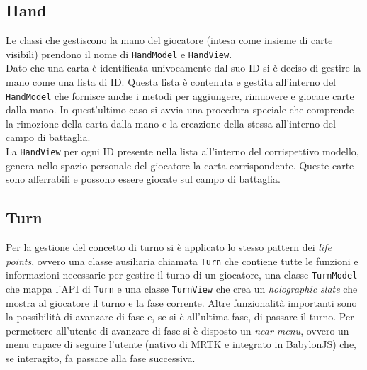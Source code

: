 \subsection{Hand}\label{subsec:hand}
Le classi che gestiscono la mano del giocatore (intesa come insieme di carte visibili) prendono il nome di \texttt{HandModel} e \texttt{HandView}.\\
Dato che una carta è identificata univocamente dal suo ID si è deciso di gestire la mano come una lista di ID. Questa lista è contenuta e gestita all'interno del 
\texttt{HandModel} che fornisce anche i metodi per aggiungere, rimuovere e giocare carte dalla mano. In quest'ultimo caso si avvia una procedura speciale che comprende la rimozione
della carta dalla mano e la creazione della stessa all'interno del campo di battaglia.\\
La \texttt{HandView} per ogni ID presente nella lista all'interno del corrispettivo modello, genera nello spazio personale del giocatore la carta corrispondente. Queste carte sono 
afferrabili e possono essere giocate sul campo di battaglia.\\

\subsection{Turn}\label{subsec:turn}
Per la gestione del concetto di turno si è applicato lo stesso pattern dei \textit{life points}, ovvero una classe ausiliaria chiamata \texttt{Turn} che contiene tutte le funzioni e
informazioni necessarie per gestire il turno di un giocatore, una classe \texttt{TurnModel} che mappa l'API di \texttt{Turn} e una classe \texttt{TurnView} che crea un
\textit{holographic slate} che mostra al giocatore il turno e la fase corrente. Altre funzionalità importanti sono la possibilità di avanzare di fase e, se si è all'ultima fase, di
passare il turno. Per permettere all'utente di avanzare di fase si è disposto un \textit{near menu}, ovvero un menu capace di seguire l'utente (nativo di MRTK e integrato in 
BabylonJS) che, se interagito, fa passare alla fase successiva.

